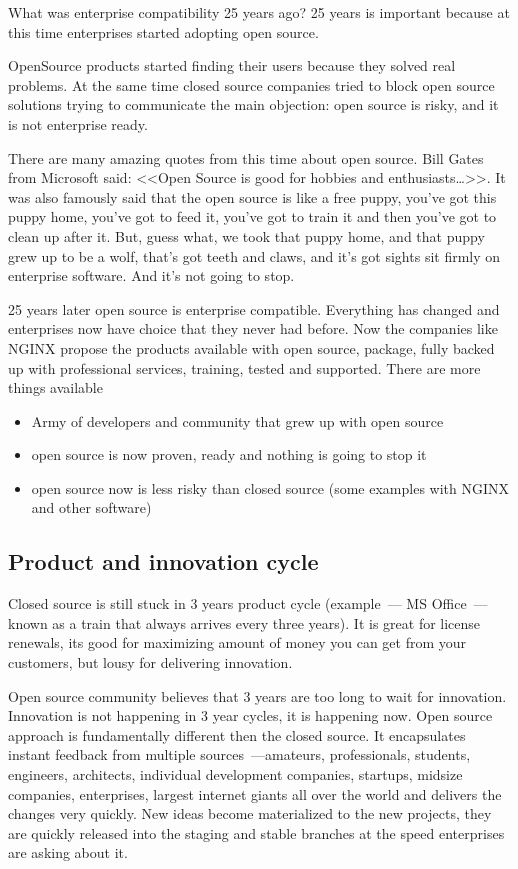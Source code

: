\documentclass[10pt, a5paper]{article}
\begin{document}
What was enterprise compatibility 25 years ago? 25 years is important because at this time enterprises started adopting open source.

OpenSource products started finding their users because they solved real problems. At the same time closed source companies tried to block open source solutions trying to communicate the main objection: open source is risky, and it is not enterprise ready.

There are many amazing quotes from this time about open source. Bill Gates from Microsoft said: <<Open Source is good for hobbies and enthusiasts\ldots>>. It was also famously said that the open source is like a free puppy, you’ve got this puppy home, you’ve got to feed it, you’ve got to train it and then you’ve got to clean up after it. But, guess what, we took that puppy home, and that puppy grew up to be a wolf, that’s got teeth and claws, and it’s got sights sit firmly on enterprise software. And it’s not going to stop.

25 years later open source is enterprise compatible. Everything has changed and enterprises now have choice that they never had before. Now the companies like NGINX propose the products available with open source, package, fully backed up with professional services, training, tested and supported. There are more things available 
\begin{itemize}
\item Army of developers and community that grew up with open source
\item open source is now proven, ready and nothing is going to stop it
\item open source now is less risky than closed source (some examples with NGINX and other software)
\end{itemize}

\subsection*{Product and innovation cycle}

Closed source is still stuck in 3 years product cycle (example~--- MS Office~--- known as a train that always arrives every three years). It is great for license renewals, its good for maximizing amount of money you can get from your customers, but lousy for delivering innovation.
 
Open source community believes that 3 years are too long to wait for innovation. Innovation is not happening in 3 year cycles, it is happening now. Open source approach is fundamentally different then the closed source. It encapsulates instant feedback from multiple sources~---\linebreak amateurs, professionals, students, engineers, architects, individual development companies, startups, midsize companies, enterprises, largest internet giants all over the world and delivers the changes very quickly. New ideas become materialized to the new projects, they are quickly released into the staging and stable branches at the speed enterprises are asking about it.
\end{document}
